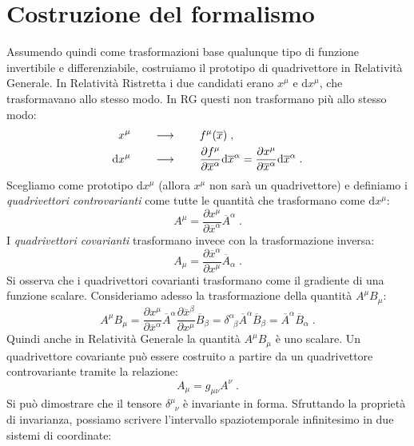 \documentclass[12pt,a4paper]{report}
\theoremstyle{definition}
\newcommand{\diff}[1][]{\mathrm{d}#1}
\begin{document}
\section{Costruzione del formalismo}
Assumendo quindi come trasformazioni base qualunque tipo di funzione invertibile e differenziabile, costruiamo il prototipo di quadrivettore in Relatività Generale. In Relatività Ristretta i due candidati erano $x^{\mu}$ e $\diff{x^{\mu}}$, che trasformavano allo stesso modo. In RG questi non trasformano più allo stesso modo:
\begin{align}
x^{\mu} \qquad &\longrightarrow \qquad f^{\mu}(\overline{x})\;, \notag \\
\diff{x^{\mu}}\qquad &\longrightarrow \qquad \frac{\partial f^{\mu}}{\partial \overline{x}^{\alpha}}\diff{\overline{x}^{\alpha}}=\frac{\partial x^{\mu}}{\partial \overline{x}^{\alpha}}\diff{\overline{x}^{\alpha}}\;.
\end{align}
Scegliamo come prototipo $\diff{x^{\mu}}$ (allora $x^{\mu}$ non sarà un quadrivettore) e definiamo i \emph{quadrivettori controvarianti} come tutte le quantità che trasformano come $\diff{x^{\mu}}$:
\begin{equation}
A^{\mu}=\frac{\partial x^{\mu}}{\partial\overline{x}^{\alpha}}\overline{A}^{\alpha}\;.
\end{equation}
I \emph{quadrivettori covarianti} trasformano invece con la trasformazione inversa:
\begin{equation}
A_{\mu}=\frac{\partial\overline{x}^{\alpha}}{\partial x^{\mu}}\overline{A}_{\alpha}\;.
\end{equation}
Si osserva che i quadrivettori covarianti trasformano come il gradiente di una funzione scalare. Consideriamo adesso la trasformazione della quantità $A^{\mu}B_{\mu}$:
\begin{equation}
A^{\mu}B_{\mu}=\frac{\partial x^{\mu}}{\partial\overline{x}^{\alpha}}\overline{A}^{\alpha}\frac{\partial \overline{x}^{\beta}}{\partial x^{\mu}}\overline{B}_{\beta}=\delta^{\alpha}_{\;\;\beta}\overline{A}^{\alpha}\overline{B}_{\beta}=\overline{A}^{\alpha}\overline{B}_{\alpha}\;.
\end{equation}
Quindi anche in Relatività Generale la quantità $A^{\mu}B_{\mu}$ è uno scalare. Un quadrivettore covariante può essere costruito a partire da un quadrivettore controvariante tramite la relazione:
\begin{equation}
A_{\mu}=g_{\mu\nu}A^{\nu}\;.
\end{equation}
Si può dimostrare che il tensore $\delta^{\mu}_{\;\;\nu}$ è invariante in forma. Sfruttando la proprietà di invarianza, possiamo scrivere l'intervallo spaziotemporale infinitesimo in due sistemi di coordinate:
\end{document}
